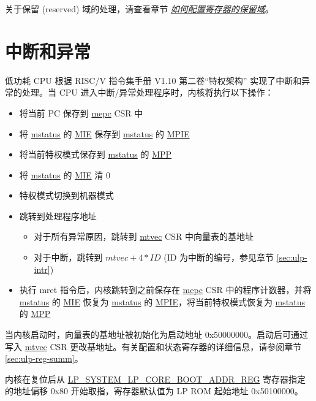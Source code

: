 \documentclass[main\_\_CN.tex]{subfiles}
\begin{document}
关于保留 (reserved) 域的处理，请查看章节 \hyperref[programming-reserved-field]{\textit{如何配置寄存器的保留域}}。



\section{中断和异常}

低功耗 CPU 根据 RISC\-/V 指令集手册 V1.10 第二卷“特权架构” 实现了中断和异常的处理。当 CPU 进入中断/异常处理程序时，内核将执行以下操作：
\begin{itemize}
    \item 将当前 PC 保存到 \hyperref[regdesc:LPMEPC]{mepc} CSR 中
    \item 将 \hyperref[regdesc:LPMSTATUS]{mstatus} 的 \hyperref[fielddesc:LPMSTATUSMIE]{MIE} 保存到 \hyperref[regdesc:LPMSTATUS]{mstatus} 的 \hyperref[fielddesc:LPMSTATUSMPIE]{MPIE}
    \item 将当前特权模式保存到 \hyperref[regdesc:LPMSTATUS]{mstatus} 的 \hyperref[fielddesc:LPMSTATUSMPP]{MPP}
    \item 将 \hyperref[regdesc:LPMSTATUS]{mstatus} 的 \hyperref[fielddesc:LPMSTATUSMIE]{MIE}  清 0
    \item 特权模式切换到机器模式
    \item 跳转到处理程序地址
        \begin{itemize}
            \item 对于所有异常原因，跳转到 \hyperref[regdesc:LPMTVEC]{mtvec} CSR 中向量表的基地址
            \item 对于中断，跳转到 $mtvec + 4*ID$ (ID 为中断的编号，参见章节 \ref{sec:ulp-intr})
        \end{itemize}
    \item 执行 mret 指令后，内核跳转到之前保存在 \hyperref[regdesc:LPMEPC]{mepc} CSR 中的程序计数器，并将 \hyperref[regdesc:LPMSTATUS]{mstatus} 的 \hyperref[fielddesc:LPMSTATUSMIE]{MIE} 恢复为 \hyperref[regdesc:LPMSTATUS]{mstatus} 的 \hyperref[fielddesc:LPMSTATUSMPIE]{MPIE}，将当前特权模式恢复为 \hyperref[regdesc:LPMSTATUS]{mstatus} 的 \hyperref[fielddesc:LPMSTATUSMPP]{MPP}
\end{itemize}


当内核启动时，向量表的基地址被初始化为启动地址 0x50000000。启动后可通过写入 \hyperref[regdesc:LPMTVEC]{mtvec} CSR 更改基地址。有关配置和状态寄存器的详细信息，请参阅章节 \ref{sec:ulp-reg-summ}。

内核在复位后从 \hyperref[regdesc:LPSYSTEMLPCOREBOOTADDRREG]{LP\_SYSTEM\_LP\_CORE\_BOOT\_ADDR\_REG} 寄存器指定的地址偏移 0x80 开始取指，寄存器默认值为 LP ROM 起始地址 0x50100000。
\end{document}

